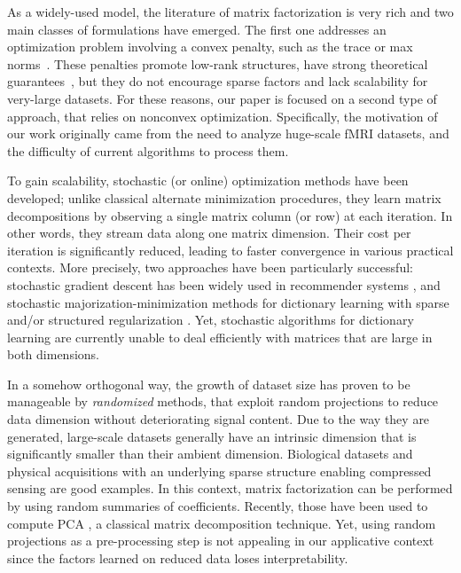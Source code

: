 \documentclass{article}
\begin{document}
As a widely-used model, the literature of matrix factorization is very
rich and two main classes of formulations have emerged. The first one addresses
an optimization problem involving a convex penalty, such as the trace or max
norms~\cite{srebro_maximum-margin_2004}. These penalties
promote low-rank structures, have strong theoretical guarantees~\citep{candes_exact_2009}, but they
do not encourage sparse factors and lack scalability for very-large
datasets. For these reasons, our paper is focused on a second type of
approach, that relies on nonconvex optimization. Specifically, the motivation of
our work originally came from the need to analyze huge-scale fMRI datasets, and
the difficulty of current algorithms to process them.

To gain scalability, stochastic (or online) optimization methods have been
developed; unlike classical alternate minimization procedures, they learn
matrix decompositions by observing a single matrix column (or row) at each
iteration. In other words, they stream data along one matrix dimension.  Their
cost per iteration is significantly reduced, leading to faster convergence in
various practical contexts.  More precisely, two approaches have been
particularly successful: stochastic gradient descent
\citep[see][]{bottou_large-scale_2010} has been widely used in recommender
systems \citep[see][and references therein]{bell_lessons_2007,
rendle_online-updating_2008,rendle_factorization_2010,blondel_convex_2015}, and
stochastic majorization-minimization methods for dictionary learning with
sparse and/or structured regularization
\cite{mairal_online_2010,mairal_stochastic_2013}.
Yet, stochastic algorithms for dictionary learning are currently unable to deal
efficiently with matrices that are large in both dimensions.






In a somehow orthogonal way, the growth of dataset size has proven to be
manageable by \textit{randomized} methods, that exploit random projections
\citep{johnson_extensions_1984,bingham_random_2001} to reduce data dimension without deteriorating
signal content. Due to the way they are generated, large-scale datasets generally have an intrinsic dimension that is significantly smaller than their ambient
dimension.
Biological datasets \cite{mckeown_analysis_1998} and physical acquisitions with
an underlying sparse structure enabling compressed sensing
\cite{candes_near-optimal_2006} are good examples. In this context, matrix
factorization can be performed by using random summaries of coefficients. Recently, those have been used to compute PCA \citep{halko_finding_2009}, a
classical matrix decomposition technique. Yet, using random projections as a
pre-processing step is not appealing in our applicative context since the factors
learned on reduced data loses interpretability.
\end{document}
